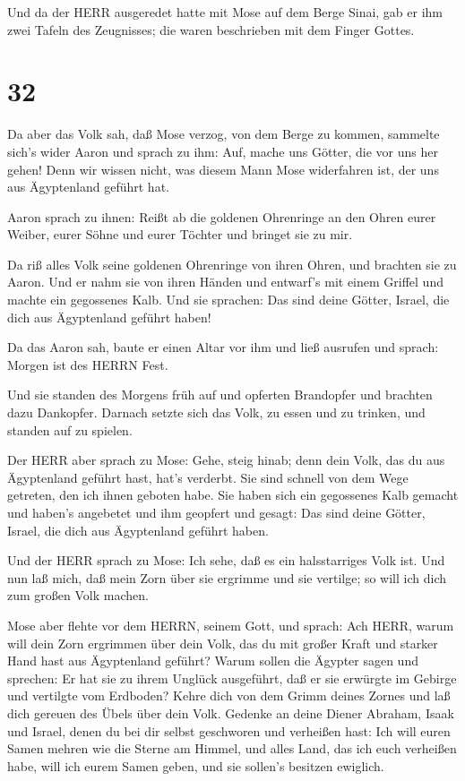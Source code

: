  Und da der HERR ausgeredet hatte mit Mose auf dem Berge
Sinai, gab er ihm zwei Tafeln des Zeugnisses; die waren beschrieben mit
dem Finger Gottes.

\hypertarget{section-31}{%
\section{32}\label{section-31}}

 Da aber das Volk sah, daß Mose verzog, von dem Berge zu
kommen, sammelte sich's wider Aaron und sprach zu ihm: Auf, mache uns
Götter, die vor uns her gehen! Denn wir wissen nicht, was diesem Mann
Mose widerfahren ist, der uns aus Ägyptenland geführt hat.

 Aaron sprach zu ihnen: Reißt ab die goldenen Ohrenringe an
den Ohren eurer Weiber, eurer Söhne und eurer Töchter und bringet sie zu
mir.

 Da riß alles Volk seine goldenen Ohrenringe von ihren
Ohren, und brachten sie zu Aaron.  Und er nahm sie von ihren
Händen und entwarf's mit einem Griffel und machte ein gegossenes Kalb.
Und sie sprachen: Das sind deine Götter, Israel, die dich aus
Ägyptenland geführt haben!

 Da das Aaron sah, baute er einen Altar vor ihm und ließ
ausrufen und sprach: Morgen ist des HERRN Fest.

 Und sie standen des Morgens früh auf und opferten
Brandopfer und brachten dazu Dankopfer. Darnach setzte sich das Volk, zu
essen und zu trinken, und standen auf zu spielen.

 Der HERR aber sprach zu Mose: Gehe, steig hinab; denn dein
Volk, das du aus Ägyptenland geführt hast, hat's verderbt. 
Sie sind schnell von dem Wege getreten, den ich ihnen geboten habe. Sie
haben sich ein gegossenes Kalb gemacht und haben's angebetet und ihm
geopfert und gesagt: Das sind deine Götter, Israel, die dich aus
Ägyptenland geführt haben.

 Und der HERR sprach zu Mose: Ich sehe, daß es ein
halsstarriges Volk ist.  Und nun laß mich, daß mein Zorn
über sie ergrimme und sie vertilge; so will ich dich zum großen Volk
machen.

 Mose aber flehte vor dem HERRN, seinem Gott, und sprach:
Ach HERR, warum will dein Zorn ergrimmen über dein Volk, das du mit
großer Kraft und starker Hand hast aus Ägyptenland geführt?
 Warum sollen die Ägypter sagen und sprechen: Er hat sie zu
ihrem Unglück ausgeführt, daß er sie erwürgte im Gebirge und vertilgte
vom Erdboden? Kehre dich von dem Grimm deines Zornes und laß dich
gereuen des Übels über dein Volk.  Gedenke an deine Diener
Abraham, Isaak und Israel, denen du bei dir selbst geschworen und
verheißen hast: Ich will euren Samen mehren wie die Sterne am Himmel,
und alles Land, das ich euch verheißen habe, will ich eurem Samen geben,
und sie sollen's besitzen ewiglich.

